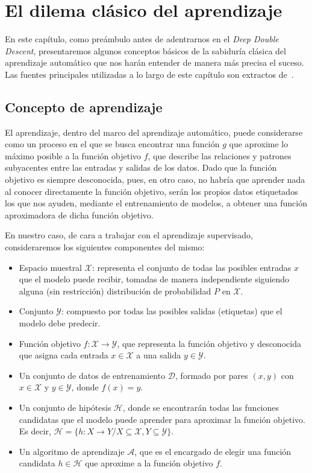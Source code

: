 \chapter{El dilema clásico del aprendizaje}\label{ch:dilema-aprendizaje}

En este capítulo, como preámbulo antes de adentrarnos en el \textit{Deep Double Descent}, presentaremos algunos conceptos básicos de la sabiduría clásica del aprendizaje automático que nos harán entender de manera más precisa el suceso. Las fuentes principales utilizadas a lo largo de este capítulo son extractos de~\cite{Mostafa2012, Bishop2006}.\newline

\section{Concepto de aprendizaje}\label{sec:concepto-de-aprendizaje}
El aprendizaje, dentro del marco del aprendizaje automático, puede considerarse como un proceso en el que se busca encontrar una función $g$ que aproxime lo máximo posible a la función objetivo $f$, que describe las relaciones y patrones subyacentes entre las entradas y salidas de los datos. Dado que la función objetivo es siempre desconocida, pues, en otro caso, no habría que aprender nada al conocer directamente la función objetivo, serán los propios datos etiquetados los que nos ayuden, mediante el entrenamiento de modelos, a obtener una función aproximadora de dicha función objetivo.\newline

En nuestro caso, de cara a trabajar con el aprendizaje supervisado, consideraremos los siguientes componentes del mismo:
\begin{itemize}
    \item Espacio muestral $\mathcal{X}$: representa el conjunto de todas las posibles entradas $x$ que el modelo puede recibir, tomadas de manera independiente siguiendo alguna (sin restricción) distribución de probabilidad $P$ en $\mathcal{X}$.
    \item Conjunto $\mathcal{Y}$: compuesto por todas las posibles salidas (etiquetas) que el modelo debe predecir.
    \item Función objetivo $f: \mathcal{X} \rightarrow \mathcal{Y}$, que representa la función objetivo y desconocida que asigna cada entrada $x \in \mathcal{X}$ a una salida $y \in \mathcal{Y}$.
    \item Un conjunto de datos de entrenamiento $\mathcal{D}$, formado por pares $(x, y)$ con $x \in \mathcal{X}$ y $y \in \mathcal{Y}$, donde $f(x) = y$.
    \item Un conjunto de hipótesis $\mathcal{H}$, donde se encontrarán todas las funciones candidatas que el modelo puede aprender para aproximar la función objetivo. Es decir, $\mathcal{H} = \{h: X \rightarrow Y / X \subseteq \mathcal{X}, Y \subseteq \mathcal{Y}\}$. 
    \item Un algoritmo de aprendizaje $\mathcal{A}$, que es el encargado de elegir una función candidata $h \in \mathcal{H}$ que aproxime a la función objetivo $f$.\newline
\end{itemize}

